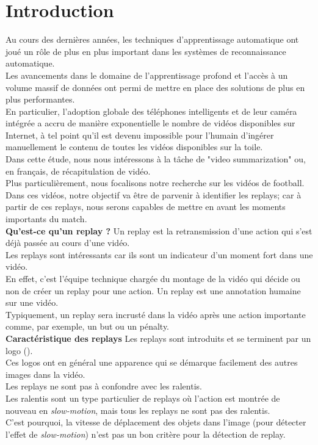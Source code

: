 \documentclass[11pt]{article}
\begin{document}
\section{Introduction}
\label{sec:org1b0f66d}
Au cours des dernières années, les techniques d'apprentissage automatique ont joué un rôle de plus en plus important dans les systèmes de reconnaissance automatique.\\
Les avancements dans le domaine de l'apprentissage profond et l'accès à un volume massif de données ont permi de mettre en place des solutions de plus en plus performantes.\\
En particulier, l'adoption globale des téléphones intelligents et de leur caméra intégrée a accru de manière exponentielle le nombre de vidéos disponibles sur Internet, à tel point qu'il est devenu impossible pour l'humain d'ingérer manuellement le contenu de toutes les vidéos disponibles sur la toile.\\
Dans cette étude, nous nous intéressons à la tâche de "video summarization" ou, en français, de récapitulation de vidéo.\\
Plus particulièrement, nous focalisons notre recherche sur les vidéos de football.\\

Dans ces vidéos, notre objectif va être de parvenir à identifier les replays; car à partir de ces replays, nous serons capables de mettre en avant les moments importants du match.\\

\textbf{Qu'est-ce qu'un replay ?} Un replay est la retransmission d'une action qui s'est déjà passée au cours d'une vidéo.\\
Les replays sont intéressants car ils sont un indicateur d'un moment fort dans une vidéo.\\
En effet, c'est l'équipe technique chargée du montage de la vidéo qui décide ou non de créer un replay pour une action. Un replay est une annotation humaine sur une vidéo.\\
Typiquement, un replay sera incrusté dans la vidéo après une action importante comme, par exemple, un but ou un pénalty.\\

\textbf{Caractéristique des replays} Les replays sont introduits et se terminent par un logo (\cite{Hao_Pan_2002}).\\
Ces logos ont en général une apparence qui se démarque facilement des autres images dans la vidéo.\\
Les replays ne sont pas à confondre avec les ralentis.\\
Les ralentis sont un type particulier de replays où l'action est montrée de nouveau en \emph{slow-motion}, mais tous les replays ne sont pas des ralentis.\\
C'est pourquoi, la vitesse de déplacement des objets dans l'image (pour détecter l'effet de \emph{slow-motion}) n'est pas un bon critère pour la détection de replay.\\
\end{document}
